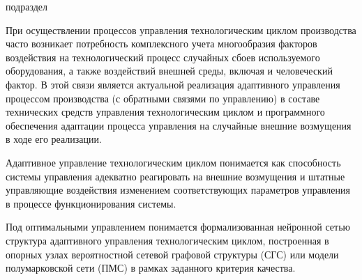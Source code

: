 \begin{SCn}

\begin{scnrelfromlist}{подраздел}
\end{scnrelfromlist}

\end{SCn}


При осуществлении процессов управления технологическим циклом  производства часто возникает потребность комплексного учета многообразия факторов воздействия на технологический процесс случайных сбоев используемого оборудования, а также воздействий внешней среды, включая и человеческий фактор. В этой связи является актуальной реализация адаптивного  управления  процессом  производства (с обратными связями по управлению)  в  составе технических средств управления технологическим циклом и программного обеспечения адаптации процесса управления на случайные внешние возмущения в ходе его реализации.

Адаптивное управление технологическим циклом понимается как способность системы управления адекватно реагировать на внешние возмущения и штатные управляющие воздействия изменением соответствующих параметров управления в процессе функционирования системы.

Под оптимальными управлением понимается формализованная нейронной сетью структура адаптивного управления технологическим циклом, построенная в опорных узлах вероятностной сетевой графовой структуры (СГС) или модели полумарковской сети (ПМС) в рамках заданного критерия качества.

